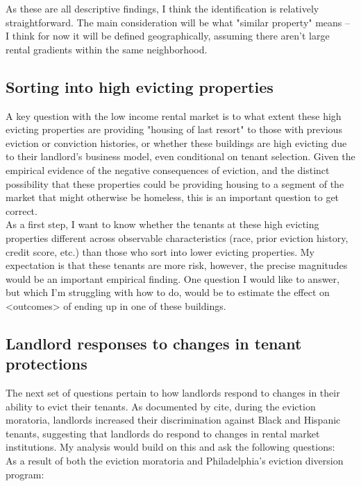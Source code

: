 \documentclass{article}
\begin{document}
As these are all descriptive findings, I think the identification is relatively straightforward. The main consideration will be what "similar property" means -- I think for now it will be defined geographically, assuming there aren't large rental gradients within the same neighborhood.


\subsection{Sorting into high evicting properties}
A key question with the low income rental market is to what extent these high evicting properties are providing "housing of last resort" to those with previous eviction or conviction histories, or whether these buildings are high evicting due to their landlord's business model, even conditional on tenant selection. Given the empirical evidence of the negative consequences of eviction, and the distinct possibility that these properties could be providing housing to a segment of the market that might otherwise be homeless, this is an important question to get correct. \\

As a first step, I want to know whether the tenants at these high evicting properties different across observable characteristics (race, prior eviction history, credit score, etc.) than those who sort into lower evicting properties. My expectation is that these tenants are more risk, however, the precise magnitudes would be an important empirical finding. One question I would like to answer, but which I'm struggling with how to do, would be to estimate the effect on <outcomes> of ending up in one of these buildings. \\


\subsection{Landlord responses to changes in tenant protections}

The next set of questions pertain to how landlords respond to changes in their ability to evict their tenants. As documented by cite, during the eviction moratoria, landlords increased their discrimination against Black and Hispanic tenants, suggesting that landlords do respond to changes in rental market institutions. My analysis would build on this and ask the following questions:\\

As a result of both the eviction moratoria and Philadelphia's eviction diversion program:\\
\end{document}
